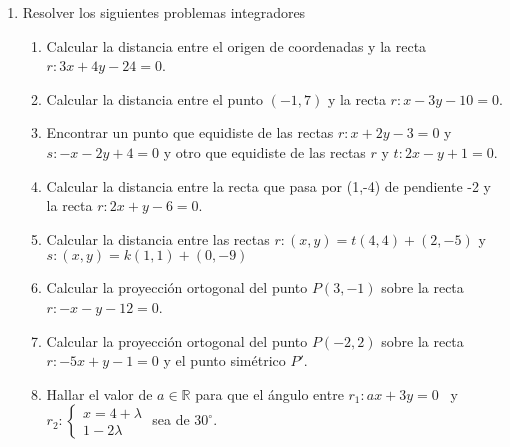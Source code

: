 \documentclass[a4paper]{article}
\newcommand{\exercise}{\item}
\begin{document}
\begin{enumerate}
\begin{multicols}{2}
\begin{enumerate} [label=(\alph*)]
		
	\end{enumerate}
	\end{multicols}

	\exercise Resolver los siguientes problemas integradores
	\begin{enumerate} [label=(\alph*)]
		
		\item Calcular la distancia entre el origen de coordenadas y la recta $r: 3x+4y -24=0$.

		\item Calcular la distancia entre el punto $(-1,7)$ y la recta $r: x-3y -10=0$.

		\item Encontrar un punto que equidiste de las rectas $r: x+2y-3=0$ y $s: -x-2y+4=0$ y otro que equidiste de las rectas $r$ y $t: 2x-y+1=0$.

		\item Calcular la distancia entre la recta que pasa por (1,-4) de pendiente -2 y la recta $r: 2x+y-6=0$.

		\item Calcular la distancia entre las rectas $r: (x,y)=t(4,4)+(2,-5)$ y $s: (x,y)=k(1,1)+(0,-9)$

		\item Calcular la proyección ortogonal del punto $P(3,-1)$ sobre la recta $r: -x-y-12=0$.

		\item Calcular la proyección ortogonal del punto $P(-2,2)$ sobre la recta $r: -5x+y-1=0$ y el punto simétrico $P'$.

		\item Hallar el valor de $a\in\mathbb{R}$ para que el ángulo entre $r_1: ax+3y=0$ ~y~ $r_2:\left\{\begin{matrix} x=4+\lambda \\ 1-2\lambda \end{matrix}\right.$ sea de $30^{\circ}$. 

	\end{enumerate}

\end{enumerate}
\end{document}
